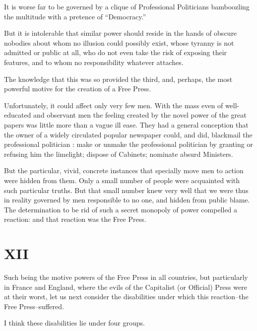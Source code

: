 \documentclass{book}
\begin{document}
It is worse far to be governed by a clique of Professional Politicians bamboozling the multitude with a pretence of “Democracy.”

But it is intolerable that similar power should reside in the hands of obscure nobodies about whom no illusion could possibly exist, whose tyranny is not admitted or public at all, who do not even take the risk of exposing their features, and to whom no responsibility whatever attaches.

The knowledge that this was so provided the third, and, perhaps, the most powerful motive for the creation of a Free Press.

Unfortunately, it could affect only very few men. With the mass even of well-educated and observant men the feeling created by the novel power of the great papers was little more than a vague ill ease. They had a general conception that the owner of a widely circulated popular newspaper could, and did, blackmail the professional politician : make or unmake the professional politician by granting or refusing him the limelight; dispose of Cabinets; nominate absurd Ministers.

But the particular, vivid, concrete instances that specially move men to action were hidden from them. Only a small number of people were acquainted with such particular truths. But that small number knew very well that we were thus in reality governed by men responsible to no one, and hidden from public blame. The determination to be rid of such a secret monopoly of power compelled a reaction: and that reaction was the Free Press.

\chapter*{XII}
\label{chapter-13}
Such being the motive powers of the Free Press in all countries, but particularly in France and England, where the evils of the Capitalist (or Official) Press were at their worst, let us next consider the disabilities under which this reaction–the Free Press–suffered.

I think these disabilities lie under four groups.
\end{document}

